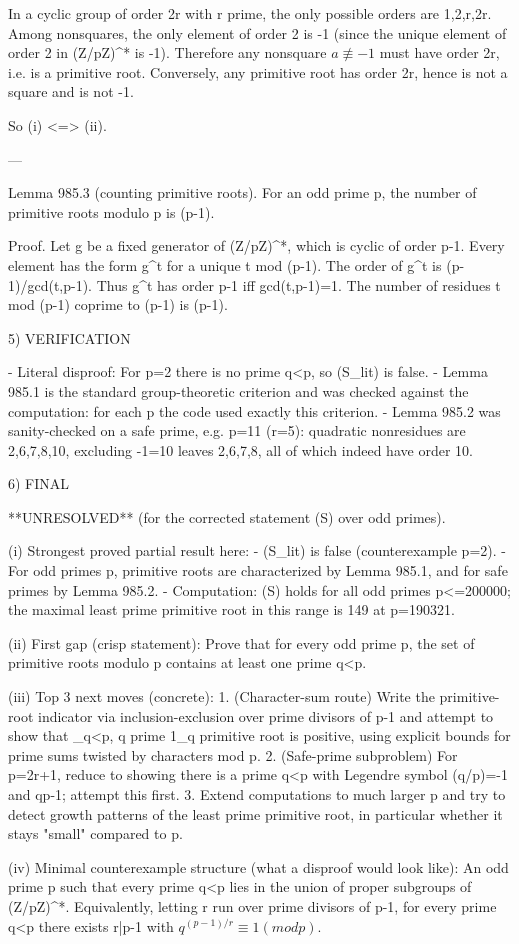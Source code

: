 In a cyclic group of order 2r with r prime, the only possible orders are 1,2,r,2r.
Among nonsquares, the only element of order 2 is -1 (since the unique element of order 2
in (Z/pZ)^* is -1). Therefore any nonsquare \(a \not\equiv -1\) must have order 2r, i.e. is a
primitive root.
Conversely, any primitive root has order 2r, hence is not a square and is not -1.

So (i) <=> (ii).

---

Lemma 985.3 (counting primitive roots).
For an odd prime p, the number of primitive roots modulo p is \varphi(p-1).

Proof.
Let g be a fixed generator of (Z/pZ)^*, which is cyclic of order p-1. Every element has the
form g^t for a unique t mod (p-1). The order of g^t is (p-1)/gcd(t,p-1). Thus g^t has order
p-1 iff gcd(t,p-1)=1. The number of residues t mod (p-1) coprime to (p-1) is \varphi(p-1).

5) VERIFICATION

- Literal disproof: For p=2 there is no prime q<p, so (S_lit) is false.
- Lemma 985.1 is the standard group-theoretic criterion and was checked against the
  computation: for each p the code used exactly this criterion.
- Lemma 985.2 was sanity-checked on a safe prime, e.g. p=11 (r=5): quadratic nonresidues
  are {2,6,7,8,10}, excluding -1=10 leaves {2,6,7,8}, all of which indeed have order 10.

6) FINAL

**UNRESOLVED** (for the corrected statement (S) over odd primes).

(i) Strongest proved partial result here:
    - (S_lit) is false (counterexample p=2).
    - For odd primes p, primitive roots are characterized by Lemma 985.1, and for safe primes
      by Lemma 985.2.
    - Computation: (S) holds for all odd primes p<=200000; the maximal least prime primitive
      root in this range is 149 at p=190321.

(ii) First gap (crisp statement):
    Prove that for every odd prime p, the set of primitive roots modulo p contains at least
    one prime q<p.

(iii) Top 3 next moves (concrete):
    1. (Character-sum route) Write the primitive-root indicator via inclusion-exclusion over
       prime divisors of p-1 and attempt to show that \sum_{q<p, q prime} 1_{q primitive root}
       is positive, using explicit bounds for prime sums twisted by characters mod p.
    2. (Safe-prime subproblem) For p=2r+1, reduce to showing there is a prime q<p with
       Legendre symbol (q/p)=-1 and q\ne p-1; attempt this first.
    3. Extend computations to much larger p and try to detect growth patterns of the least
       prime primitive root, in particular whether it stays "small" compared to p.

(iv) Minimal counterexample structure (what a disproof would look like):
    An odd prime p such that every prime q<p lies in the union of proper subgroups of
    (Z/pZ)^*. Equivalently, letting r run over prime divisors of p-1,
      for every prime q<p there exists r|p-1 with \(q^{(p-1)/r} \equiv 1 (mod p)\).

